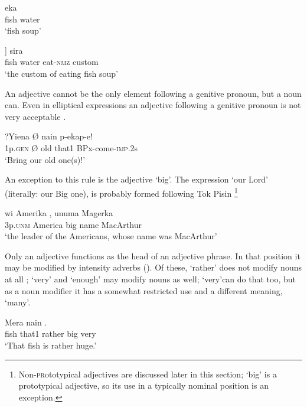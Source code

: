 \ea%
\label{ex:3:x15}
\gll {} eka \\
fish water\\
\glt`fish soup'
\z

\ea%
\label{ex:3:x16}
\gll [[\textstyleEmphasizedVernacularWords{mera} \textstyleEmphasizedVernacularWords{eka}] ] sira \\
fish water eat-\textsc{nmz} custom\\
\glt`the custom of eating fish soup'
\z

An adjective cannot be the only element following a genitive pronoun, but a noun can. Even in elliptical expressions an adjective following a genitive pronoun is not very acceptable . 

\ea%
\label{ex:3:x17}
\gll ?Yiena {\O }  nain p-ekap-e! \\
1p.\textsc{gen} {\O} old that1 BPx-come-\textsc{imp}.2s\\
\glt`Bring our old one(s)!'
\z

An exception to this rule is the adjective  `big'. The expression  `our Lord' (literally: our Big one), is probably formed following Tok Pisin \footnote{Non-\textsc{pr}ototypical adjectives are discussed later in this section; `big' is a prototypical adjective, so its use in a typically nominal position is an exception.} 

\ea%
\label{ex:3:x105}
\gll wi Amerika , unuma Magerka \\
3p.\textsc{unm} America big name MacArthur\\
\glt`the leader of the Americans, whose name was MacArthur'
\z

Only an adjective functions as the head of an adjective phrase. In that position it may be modified by intensity adverbs (). Of these,  `rather' does not modify nouns at all ;  `very' and  `enough' may modify nouns as well;  `very'can do that too, but as a noun modifier it has a somewhat restricted use and a different meaning, `many'.

\ea%
\label{ex:3:x18}
\gll Mera nain   . \\
fish that1 rather big very\\
\glt`That fish is rather huge.'
\z

